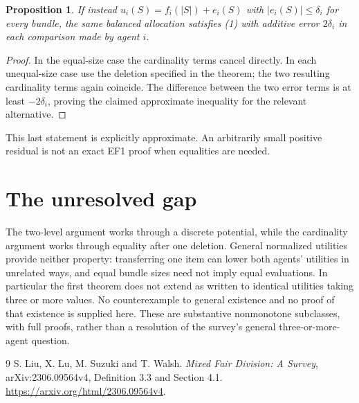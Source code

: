 \documentclass[11pt]{article}
\newtheorem{proposition}[theorem]{Proposition}
\theoremstyle{definition}
\begin{document}
\begin{proposition}
If instead $u_i(S)=f_i(|S|)+e_i(S)$ with
$|e_i(S)|\le\delta_i$ for every bundle, the same balanced allocation
satisfies (1) with additive error $2\delta_i$ in each comparison made
by agent $i$.
\end{proposition}
\begin{proof}
In the equal-size case the cardinality terms cancel directly. In each
unequal-size case use the deletion specified in the theorem; the two
resulting cardinality terms again coincide. The difference between the
two error terms is at least $-2\delta_i$, proving the claimed approximate
inequality for the relevant alternative.
\end{proof}
This last statement is explicitly approximate. An arbitrarily small
positive residual is not an exact EF1 proof when equalities are needed.

\section*{The unresolved gap}
The two-level argument works through a discrete potential, while the
cardinality argument works through equality after one deletion. General
normalized utilities provide neither property: transferring one item
can lower both agents' utilities in unrelated ways, and equal bundle
sizes need not imply equal evaluations. In particular the first theorem
does not extend as written to identical utilities taking three or more
values. No counterexample to general existence and no proof of that
existence is supplied here. These are substantive nonmonotone subclasses,
with full proofs, rather than a resolution of the survey's general
three-or-more-agent question.

\begin{thebibliography}{9}
 S. Liu, X. Lu, M. Suzuki and T. Walsh.
\emph{Mixed Fair Division: A Survey}, arXiv:2306.09564v4,
Definition 3.3 and Section 4.1.
\url{https://arxiv.org/html/2306.09564v4}.
\end{thebibliography}
\end{document}
